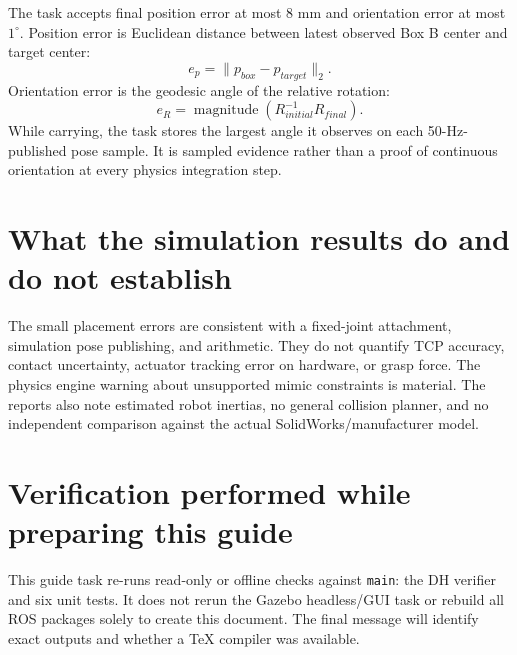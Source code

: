 The task accepts final position error at most 8 mm and orientation error at
most $1^\circ$. Position error is Euclidean distance between latest observed
Box B center and target center:
\begin{equation}
 e_p=\|p_{box}-p_{target}\|_2.
\end{equation}
Orientation error is the geodesic angle of the relative rotation:
\begin{equation}
 e_R=\operatorname{magnitude}(R_{initial}^{-1}R_{final}).
\end{equation}
While carrying, the task stores the largest angle it observes on each
50-Hz-published pose sample. It is sampled evidence rather than a proof of
continuous orientation at every physics integration step.

\section{What the simulation results do and do not establish}
The small placement errors are consistent with a fixed-joint attachment,
simulation pose publishing, and arithmetic. They do not quantify TCP accuracy,
contact uncertainty, actuator tracking error on hardware, or grasp force. The
physics engine warning about unsupported mimic constraints is material. The
reports also note estimated robot inertias, no general collision planner, and
no independent comparison against the actual SolidWorks/manufacturer model.

\section{Verification performed while preparing this guide}
This guide task re-runs read-only or offline checks against \texttt{main}:
the DH verifier and six unit tests. It does not rerun the Gazebo headless/GUI
task or rebuild all ROS packages solely to create this document. The final
message will identify exact outputs and whether a TeX compiler was available.

